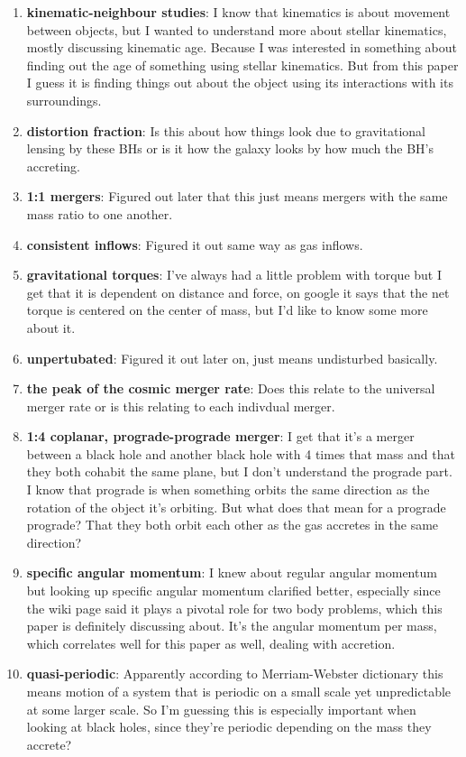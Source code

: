 \documentclass{article}
\begin{document}
\begin{enumerate}
	\item \textbf{kinematic-neighbour studies}: I know that kinematics is about movement between objects, but I wanted to understand more about stellar kinematics, mostly discussing kinematic age. Because I was interested in something about finding out the age of something using stellar kinematics. But from this paper I guess it is finding things out about the object using its interactions with its surroundings.
	\item \textbf{distortion fraction}: Is this about how things look due to gravitational lensing by these BHs or is it how the galaxy looks by how much the BH's accreting.
	\item \textbf{1:1 mergers}: Figured out later that this just means mergers with the same mass ratio to one another.
	\item \textbf{consistent inflows}: Figured it out same way as gas inflows.
	\item \textbf{gravitational torques}: I've always had a little problem with torque but I get that it is dependent on distance and force, on google it says that the net torque is centered on the center of mass, but I'd like to know some more about it.
	\item \textbf{unpertubated}: Figured it out later on, just means undisturbed basically.
	\item \textbf{the peak of the cosmic merger rate}: Does this relate to the universal merger rate or is this relating to each indivdual merger.
	\item \textbf{1:4 coplanar, prograde-prograde merger}: I get that it's a merger between a black hole and another black hole with 4 times that mass and that they both cohabit the same plane, but I don't understand the prograde part. I know that prograde is when something orbits the same direction as the rotation of the object it's orbiting. But what does that mean for a prograde prograde? That they both orbit each other as the gas accretes in the same direction?
	\item \textbf{specific angular momentum}: I knew about regular angular momentum but looking up specific angular momentum clarified better, especially since the wiki page said it plays a pivotal role for two body problems, which this paper is definitely discussing about. It's the angular momentum per mass, which correlates well for this paper as well, dealing with accretion.
	\item \textbf{quasi-periodic}: Apparently according to Merriam-Webster dictionary this means motion of a system that is periodic on a small scale yet unpredictable at some larger scale. So I'm guessing this is especially important when looking at black holes, since they're periodic depending on the mass they accrete?

\end{enumerate}
\end{document}
